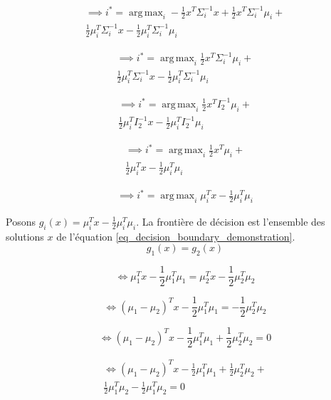 \documentclass{article}
\begin{document}
\begin{multicols}{2}
\[
\begin{split}
\implies i^{\ast} = \operatorname{arg\,max}_i  -\frac{1}{2}x^T \Sigma_i^{-1}x + \frac{1}{2}x^T \Sigma_i^{-1} \mu_i + \\
\frac{1}{2}\mu_i^T \Sigma_i^{-1} x - \frac{1}{2}\mu_i^T \Sigma_i^{-1} \mu_i 
\end{split}
\]

\[
\begin{split}
\implies i^{\ast} = \operatorname{arg\,max}_i \frac{1}{2}x^T \Sigma_i^{-1} \mu_i + \\
\frac{1}{2}\mu_i^T \Sigma_i^{-1} x - \frac{1}{2}\mu_i^T \Sigma_i^{-1} \mu_i 
\end{split}
\]

\[
\begin{split}
\implies i^{\ast} = \operatorname{arg\,max}_i \frac{1}{2}x^T I_2^{-1} \mu_i + \\
\frac{1}{2}\mu_i^T I_2^{-1} x - \frac{1}{2}\mu_i^T I_2^{-1} \mu_i 
\end{split}
\]

\[
\begin{split}
\implies i^{\ast} = \operatorname{arg\,max}_i \frac{1}{2}x^T \mu_i + \\
\frac{1}{2}\mu_i^T x - \frac{1}{2}\mu_i^T \mu_i 
\end{split}
\]

\[
\begin{split}
\implies i^{\ast} = \operatorname{arg\,max}_i \mu_i^T x - \frac{1}{2}\mu_i^T \mu_i 
\end{split}
\]

Posons $g_i(x) = \mu_i^T x - \frac{1}{2}\mu_i^T \mu_i$. La frontière de décision est l'ensemble des solutions $x$ de l'équation \ref{eq_decision_boundary_demonstration}.
\begin{equation}
\label{eq_decision_boundary_demonstration}
g_1(x) = g_2(x)
\end{equation}

\[
\iff \mu_1^T x - \frac{1}{2}\mu_1^T \mu_1 =  \mu_2^T x - \frac{1}{2}\mu_2^T \mu_2
\]

\[
\iff (\mu_1- \mu_2)^T x - \frac{1}{2}\mu_1^T \mu_1 =   - \frac{1}{2}\mu_2^T \mu_2
\]

\[
\iff (\mu_1- \mu_2)^T x - \frac{1}{2}\mu_1^T \mu_1 + \frac{1}{2}\mu_2^T \mu_2 = 0
\]

\[
\begin{split}
\iff (\mu_1- \mu_2)^T x - \frac{1}{2}\mu_1^T \mu_1 + \frac{1}{2}\mu_2^T \mu_2 + \\
\frac{1}{2}\mu_1^T \mu_2 - \frac{1}{2}\mu_1^T \mu_2 = 0
\end{split}
\]


\end{multicols}
\end{document}
